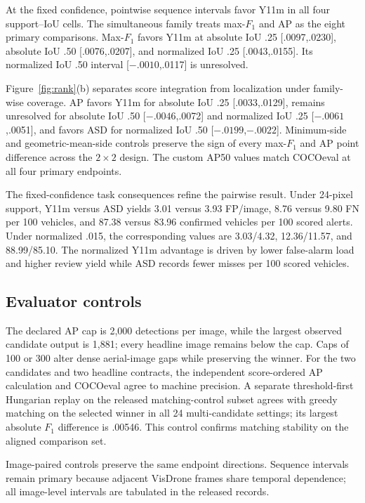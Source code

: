 \documentclass[journal]{IEEEtran}
\begin{document}
At the fixed confidence, pointwise sequence intervals favor Y11m in all four support--IoU cells. The simultaneous family treats max-$F_1$ and AP as the eight primary comparisons. Max-$F_1$ favors Y11m at absolute IoU .25 [.0097,.0230], absolute IoU .50 [.0076,.0207], and normalized IoU .25 [.0043,.0155]. Its normalized IoU .50 interval [$-.0010$,.0117] is unresolved.

Figure~\ref{fig:rank}(b) separates score integration from localization under family-wise coverage. AP favors Y11m for absolute IoU .25 [.0033,.0129], remains unresolved for absolute IoU .50 [$-.0046$,.0072] and normalized IoU .25 [$-.0061$,.0051], and favors ASD for normalized IoU .50 [$-.0199$,$-.0022$]. Minimum-side and geometric-mean-side controls preserve the sign of every max-$F_1$ and AP point difference across the $2\!\times\!2$ design. The custom AP50 values match COCOeval at all four primary endpoints.

The fixed-confidence task consequences refine the pairwise result. Under 24-pixel support, Y11m versus ASD yields 3.01 versus 3.93 FP/image, 8.76 versus 9.80 FN per 100 vehicles, and 87.38 versus 83.96 confirmed vehicles per 100 scored alerts. Under normalized .015, the corresponding values are 3.03/4.32, 12.36/11.57, and 88.99/85.10. The normalized Y11m advantage is driven by lower false-alarm load and higher review yield while ASD records fewer misses per 100 scored vehicles.

\subsection{Evaluator controls}
The declared AP cap is 2,000 detections per image, while the largest observed candidate output is 1,881; every headline image remains below the cap. Caps of 100 or 300 alter dense aerial-image gaps while preserving the winner. For the two candidates and two headline contracts, the independent score-ordered AP calculation and COCOeval agree to machine precision. A separate threshold-first Hungarian replay on the released matching-control subset agrees with greedy matching on the selected winner in all 24 multi-candidate settings; its largest absolute $F_1$ difference is .00546. This control confirms matching stability on the aligned comparison set.

Image-paired controls preserve the same endpoint directions. Sequence intervals remain primary because adjacent VisDrone frames share temporal dependence; all image-level intervals are tabulated in the released records.
\end{document}
